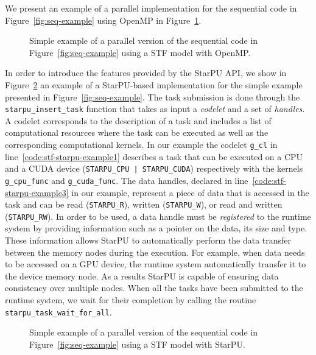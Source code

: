 \documentclass{article}
\newcommand{\starpu}{{StarPU}\xspace}
\newcommand{\openmp}{OpenMP\xspace}
\begin{document}
We present an example of a parallel implementation for the sequential
code in Figure~\ref{fig:seq-example} using OpenMP in
Figure~\ref{fig:stf-openmp-example}.

\begin{figure}[!h]
  \centering 
  \caption{\label{fig:stf-openmp-example}Simple example of a parallel version
    of the sequential code in Figure~\ref{fig:seq-example} using a STF
    model with \openmp.}
\end{figure}

In order to introduce the features provided by the StarPU API, we show
in Figure~\ref{fig:stf-starpu-example} an example of a StarPU-based
implementation for the simple example presented in
Figure~\ref{fig:seq-example}. The task submission is done through the
\texttt{starpu\_insert\_task} function that takes as input a
\textit{codelet} and a set of \textit{handles}. A codelet corresponds
to the description of a task and includes a list of computational
resources where the task can be executed as well as the corresponding
computational kernels. In our example the codelet \texttt{g\_cl} in
line~\ref{code:stf-starpu-example1} describes a task that can be
executed on a CPU and a CUDA device (\texttt{STARPU\_CPU |
  STARPU\_CUDA}) respectively with the kernels \texttt{g\_cpu\_func}
and \texttt{g\_cuda\_func}. The data handles, declared in
line~\ref{code:stf-starpu-example3} in our example, represent a piece
of data that is accessed in the task and can be read
(\texttt{STARPU\_R}), written (\texttt{STARPU\_W}), or read and
written (\texttt{STARPU\_RW}). In order to be used, a data handle must
be \textit{registered} to the runtime system by providing information
such as a pointer on the data, its size and type. These information
allows StarPU to automatically perform the data transfer between the
memory nodes during the execution. For example, when data needs to be
accessed on a GPU device, the runtime system automatically transfer it
to the device memory node. As a results StarPU is capable of ensuring
data consistency over multiple nodes. When all the tasks have been
submitted to the runtime system, we wait for their completion by
calling the routine \texttt{starpu\_task\_wait\_for\_all}.

\begin{figure}[!h]
  \centering 
  \caption{\label{fig:stf-starpu-example}Simple example of a parallel version
    of the sequential code in Figure~\ref{fig:seq-example} using a STF
    model with \starpu.}
\end{figure}
\end{document}

